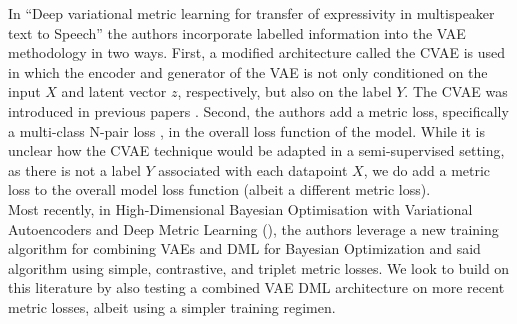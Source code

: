 \documentclass[./dissertation.tex]{subfiles}
\begin{document}
In ``Deep variational metric learning for transfer of expressivity in multispeaker text to Speech'' \cite{kulkarni2020deep} the authors incorporate labelled information into the VAE methodology in two ways. First, a modified architecture called the CVAE is used in which the encoder and generator of the VAE is not only conditioned on the input $X$ and latent vector $z$, respectively, but also on the label $Y$. The CVAE was introduced in previous papers \cite{sohn2015learning} \cite{dahmani2019conditional}. Second, the authors add a metric loss, specifically a multi-class N-pair loss \cite{sohn2016improved}, in the overall loss function of the model. While it is unclear how the CVAE technique would be adapted in a semi-supervised setting, as there is not a label $Y$ associated with each datapoint $X$, we do add a metric loss to the overall model loss function (albeit a different metric loss). \\
    
Most recently, in High-Dimensional Bayesian Optimisation with Variational Autoencoders and Deep Metric Learning (\cite{grosnit2021high}), the authors leverage a new training algorithm for combining VAEs and DML for Bayesian Optimization and said algorithm using simple, contrastive, and triplet metric losses. We look to build on this literature by also testing a combined VAE DML architecture on more recent metric losses, albeit using a simpler training regimen.
\end{document}
